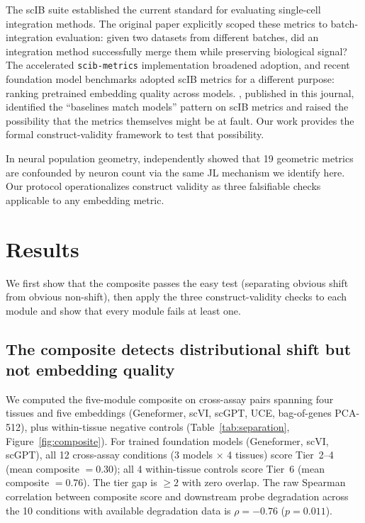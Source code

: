 \documentclass[10pt,letterpaper]{article}
\begin{document}
The scIB suite \citep{luecken2022scib} established the current standard for evaluating single-cell integration methods. The original paper explicitly scoped these metrics to batch-integration evaluation: given two datasets from different batches, did an integration method successfully merge them while preserving biological signal? The accelerated \texttt{scib-metrics} implementation \citep{scibmetrics2023} broadened adoption, and recent foundation model benchmarks \citep{wu2025scfm, vcbench2026, unifiedscfm2026, cellxgeneintegration2026} adopted scIB metrics for a different purpose: ranking pretrained embedding quality across models. \citet{wu2025scfm}, published in this journal, identified the ``baselines match models'' pattern on scIB metrics and raised the possibility that the metrics themselves might be at fault. Our work provides the formal construct-validity framework to test that possibility.

In neural population geometry, \citet{tower2026bracket} independently showed that 19 geometric metrics are confounded by neuron count via the same JL mechanism we identify here. Our protocol operationalizes construct validity as three falsifiable checks applicable to any embedding metric.


\section{Results}

We first show that the composite passes the easy test (separating obvious shift from obvious non-shift), then apply the three construct-validity checks to each module and show that every module fails at least one.

\subsection{The composite detects distributional shift but not embedding quality}

We computed the five-module composite on cross-assay pairs spanning four tissues and five embeddings (Geneformer, scVI, scGPT, UCE, bag-of-genes PCA-512), plus within-tissue negative controls (Table~\ref{tab:separation}, Figure~\ref{fig:composite}). For trained foundation models (Geneformer, scVI, scGPT), all 12 cross-assay conditions (3 models $\times$ 4 tissues) score Tier~2--4 (mean composite $= 0.30$); all 4 within-tissue controls score Tier~6 (mean composite $= 0.76$). The tier gap is $\geq 2$ with zero overlap. The raw Spearman correlation between composite score and downstream probe degradation across the 10 conditions with available degradation data is $\rho = -0.76$ ($p = 0.011$).
\end{document}
